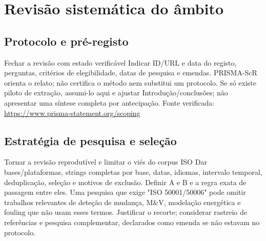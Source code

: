 
\chapter{Revisão sistemática do âmbito}
\label{cha:revisao}

\section{Protocolo e pré-registo}
\label{sec:protocolo-sr}
{Fechar a revisão com estado verificável}
{Indicar ID/URL e data do registo, perguntas, critérios de elegibilidade,
datas de pesquisa e emendas. PRISMA-ScR orienta o relato; não certifica
o método nem substitui um protocolo. Se só existe piloto de extração,
assumi-lo aqui e ajustar Introdução/conclusões; não apresentar uma síntese
completa por antecipação.
Fonte verificada: \url{https://www.prisma-statement.org/scoping}}%



\section{Estratégia de pesquisa e seleção}
\label{sec:pesquisa}
{Tornar a revisão reprodutível e limitar o viés do corpus ISO}
{Dar bases/plataformas, strings completas por base, datas, idiomas,
intervalo temporal, deduplicação, seleção e motivos de exclusão.
Definir A e B e a regra exata de passagem entre eles. Uma pesquisa que
exige "ISO 50001/50006" pode omitir trabalhos relevantes de deteção de
mudança, M\&V, modelação energética e fouling que não usam esses termos.
Justificar o recorte; considerar rastreio de referências e pesquisa
complementar, declarados como emenda se não estavam no protocolo.}%



